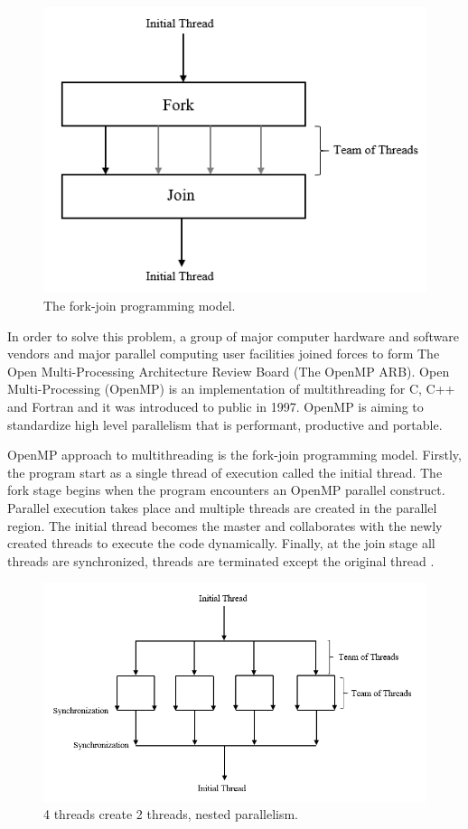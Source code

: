 \documentclass[12pt, oneside]{book}
\theoremstyle{plain}
\theoremstyle{definition}
\begin{document}
\begin{figure}[!htb]
    \centering
        \includegraphics[scale=0.6]{openmp.png}
    \caption{The fork-join programming model.}
\end{figure}

In order to solve this problem, a group of major computer hardware and software vendors and major parallel computing user facilities joined forces to form The Open Multi-Processing Architecture Review Board (The OpenMP ARB)\cite{openmpfaq}. Open Multi-Processing (OpenMP) is an implementation of multithreading for C, C++ and Fortran and it was introduced to public in 1997. OpenMP is aiming to standardize high level parallelism that is performant, productive and portable.

 OpenMP approach to multithreading is the fork-join programming model. Firstly, the program start as a single thread of execution called the initial thread. The fork stage begins when the program encounters an OpenMP parallel construct. Parallel execution takes place and multiple threads are created in the parallel region. The initial thread becomes the master and collaborates with the newly created threads to execute the code dynamically. Finally, at the join stage all threads are synchronized, threads are terminated except the original thread \cite{openmp}.

\begin{figure}[!htb]
    \centering
        \includegraphics[scale=0.7]{openmpnested.png}
    \caption{4 threads create 2 threads, nested parallelism.}
\end{figure}
\end{document}
